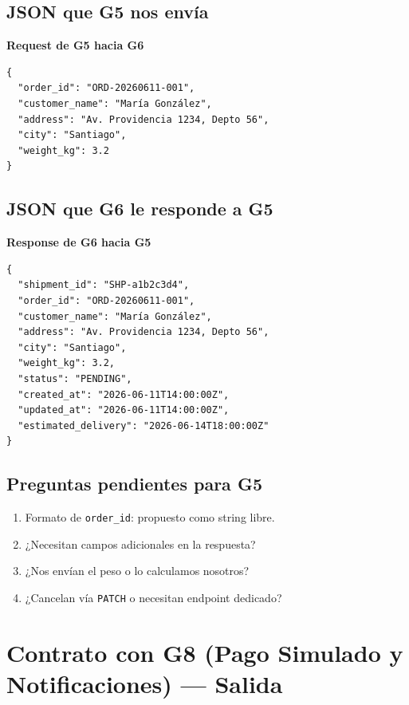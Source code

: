 \documentclass[11pt, a4paper]{article}
\newcommand{\contractheader}[1]{%
  \noindent\colorbox{primary!10}{%
    \parbox{\dimexpr\textwidth-2\fboxsep}{%
      \textbf{\faFileCode\quad #1}%
    }%
  }
  \vspace{0.3cm}
}
\begin{document}
\subsection{JSON que G5 nos envía}

\contractheader{Request de G5 hacia G6}

\begin{lstlisting}
{
  "order_id": "ORD-20260611-001",
  "customer_name": "María González",
  "address": "Av. Providencia 1234, Depto 56",
  "city": "Santiago",
  "weight_kg": 3.2
}
\end{lstlisting}

\subsection{JSON que G6 le responde a G5}

\contractheader{Response de G6 hacia G5}

\begin{lstlisting}
{
  "shipment_id": "SHP-a1b2c3d4",
  "order_id": "ORD-20260611-001",
  "customer_name": "María González",
  "address": "Av. Providencia 1234, Depto 56",
  "city": "Santiago",
  "weight_kg": 3.2,
  "status": "PENDING",
  "created_at": "2026-06-11T14:00:00Z",
  "updated_at": "2026-06-11T14:00:00Z",
  "estimated_delivery": "2026-06-14T18:00:00Z"
}
\end{lstlisting}

\subsection{Preguntas pendientes para G5}

\begin{warningbox}[title={\faExclamationCircle\quad Confirmar con G5}]
\begin{enumerate}[noitemsep]
  \item Formato de \texttt{order\_id}: propuesto como string libre.
  \item ¿Necesitan campos adicionales en la respuesta?
  \item ¿Nos envían el peso o lo calculamos nosotros?
  \item ¿Cancelan vía \texttt{PATCH} o necesitan endpoint dedicado?
\end{enumerate}
\end{warningbox}


\section{Contrato con G8 (Pago Simulado y Notificaciones) --- Salida}
\label{sec:contrato-g8}
\end{document}
